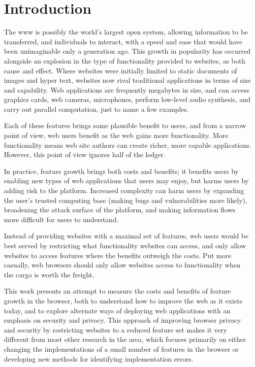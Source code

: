 \chapter{Introduction}
\label{intro}

The \gls{www} is possibly the world's largest open system, allowing information
to be transferred, and individuals to interact, with a speed and ease that would
have been unimaginable only a generation ago.  This growth in popularity
has occurred alongside an explosion in the type of functionality provided to
websites, as both cause and effect.  Where websites were initially limited
to static documents of images and hyper text, websites now rival traditional
applications in terms of size and capability.  Web applications are frequently
megabytes in size, and can access graphics cards, web cameras, microphones,
perform low-level audio synthesis, and carry out parallel computation, just to
name a few examples.

Each of these features brings some plausible benefit to users, and from a
narrow point of view, web users benefit as the web gains more functionality.
More functionality means web site authors can create richer, more capable
applications. However, this point of view ignores half of the ledger.

In practice, feature growth brings both costs and benefits; it benefits users
by enabling new types of web applications that users may enjoy, but
harms users by adding risk to the platform.  Increased complexity
can harm users by expanding the user's trusted computing base (making bugs and
vulnerabilities more likely), broadening the attack surface of the platform,
and making information flows more difficult for users to understand.

Instead of providing websites with a maximal set of features, web users would
be best served by restricting what functionality websites can access,
and only allow websites to access features where the benefits outweigh the
costs. Put more casually, web browsers should only allow websites access to
functionality when the cargo is worth the freight.

This work presents an attempt to measure the costs and benefits of feature
growth in the browser, both to understand how to improve the web as it exists
today, and to explore alternate ways of deploying web applications with
an emphasis on security and privacy.  This approach of improving browser
privacy and security by restricting websites to a reduced feature set
makes it very different from most other research in the area, which focuses
primarily on either changing the implementations of a small number of features
in the browser or developing new methods for identifying implementation errors.





